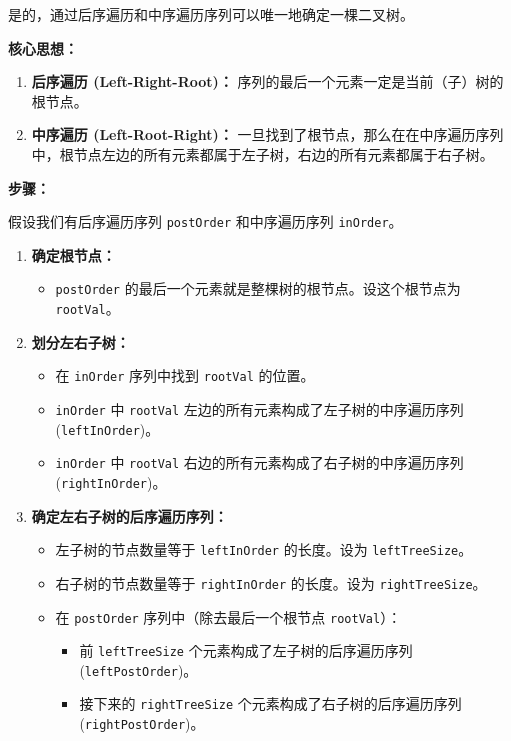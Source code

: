 是的，通过后序遍历和中序遍历序列可以唯一地确定一棵二叉树。

\textbf{核心思想：}

\begin{enumerate}
	\item \textbf{后序遍历 (Left-Right-Root)：} 序列的最后一个元素一定是当前（子）树的根节点。
	\item \textbf{中序遍历 (Left-Root-Right)：} 一旦找到了根节点，那么在在中序遍历序列中，根节点左边的所有元素都属于左子树，右边的所有元素都属于右子树。
\end{enumerate}

\textbf{步骤：}

假设我们有后序遍历序列 \lstinline{postOrder} 和中序遍历序列 \lstinline{inOrder}。

\begin{enumerate}
	\item \textbf{确定根节点：}
	\begin{itemize}
		\item \lstinline{postOrder} 的最后一个元素就是整棵树的根节点。设这个根节点为 \lstinline{rootVal}。
	\end{itemize}
	\item \textbf{划分左右子树：}
	\begin{itemize}
		\item 在 \lstinline{inOrder} 序列中找到 \lstinline{rootVal} 的位置。
		\item \lstinline{inOrder} 中 \lstinline{rootVal} 左边的所有元素构成了左子树的中序遍历序列 (\lstinline{leftInOrder})。
		\item \lstinline{inOrder} 中 \lstinline{rootVal} 右边的所有元素构成了右子树的中序遍历序列 (\lstinline{rightInOrder})。
	\end{itemize}
	\item \textbf{确定左右子树的后序遍历序列：}
	\begin{itemize}
		\item 左子树的节点数量等于 \lstinline{leftInOrder} 的长度。设为 \lstinline{leftTreeSize}。
		\item 右子树的节点数量等于 \lstinline{rightInOrder} 的长度。设为 \lstinline{rightTreeSize}。
		\item 在 \lstinline{postOrder} 序列中（除去最后一个根节点 \lstinline{rootVal}）：
		\begin{itemize}
			\item 前 \lstinline{leftTreeSize} 个元素构成了左子树的后序遍历序列 (\lstinline{leftPostOrder})。
			\item 接下来的 \lstinline{rightTreeSize} 个元素构成了右子树的后序遍历序列 (\lstinline{rightPostOrder})。

\end{itemize}
\end{itemize}
\end{enumerate}
